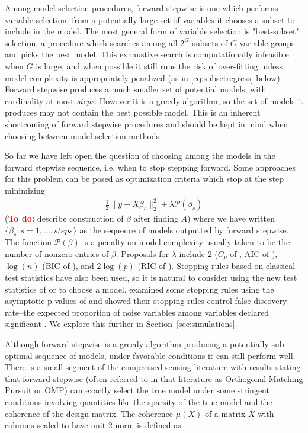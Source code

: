 \documentclass{imsart}
\newcommand{\todo}{\textcolor{red}{\textbf{To do: }}}
\newcommand{\pen}{\mathcal{P}}
\begin{document}
Among model selection procedures, forward stepwise is one which performs
variable selection: from a potentially large set of variables it chooses
a subset to include in the model. The most general form of variable
selection is  "best-subset" selection, a procedure which searches among
all $2^G$ subsets of $G$ variable groups and picks the best model.
This exhaustive search is computationally infeasible when $G$ is
large, and when possible it still
runs the risk of over-fitting unless model complexity is
appropriately penalized (as in \eqref{eq:subsetregress} below).
Forward stepwise produces a much
smaller set of potential models, with cardinality at most
\textit{steps}. However
it is a greedy algorithm, so the set of models it produces may not
contain the best possible model. This is an inherent shortcoming of
forward stepwise procedures and should be kept in mind when choosing
between model selection methods.

So far we have left open the question of choosing among the models in
the forward stepwise sequence, i.e. when to stop stepping
forward. Some approaches for this problem can be posed as optimization
criteria which stop at the step minimizing
\begin{equation}
\begin{aligned}
\label{eq:subsetregress}
\frac{1}{2} \| y - X \beta_s \|_2^2 + \lambda \pen(\beta_s)
\end{aligned}
\end{equation}
(\todo describe construction of $\beta$ after finding $A$)
where we have written $\{ \beta_s : s = 1, \ldots, steps \}$ as
the sequence of models outputted by forward stepwise. The function
$\pen(\beta)$ is a penalty on model complexity usually taken to be the
number of nonzero entries of $\beta$. Proposals for $\lambda$ include
2 ($C_p$ of \cite{CP}, AIC of \cite{AIC}), $\log(n)$ (BIC of \cite{BIC}), and
$2\log(p)$ (RIC of \cite{RIC}). Stopping rules based on classical test
statistics have also been used, so it is natural to consider using
the new test statistics of \cite{significance:lasso} or
\cite{tests:adaptive}
to choose a model. \cite{sequential:fdr} examined some stopping rules
using the asymptotic p-values of \cite{significance:lasso} and showed
their stopping rules control false discovery rate--the expected
proportion of noise variables among variables declared significant
\citep{fdr}. We explore this further in Section~\ref{sec:simulations}.

Although forward stepwise is a greedy algorithm producing a
potentially sub-optimal sequence of models, under favorable conditions
it can still perform well. There is a small segment of the
compressed sensing literature \citep{donoho:pursuit, cai:wang:omp}
with results stating that forward stepwise (often referred to in that
literature as Orthogonal Matching Pursuit or OMP) can exactly select
the true model
under some stringent conditions involving quantities like the sparsity
of the true model and the coherence of the design matrix. The
coherence $\mu(X)$ of a matrix $X$ with columns scaled to have unit
2-norm is defined as
\end{document}

